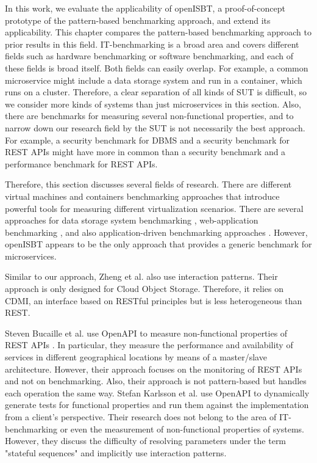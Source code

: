 In this work, we evaluate the applicability of openISBT, a proof-of-concept prototype of the pattern-based benchmarking approach, and extend its applicability. This chapter compares the pattern-based benchmarking approach to prior results in this field. IT-benchmarking is a broad area and covers different fields such as hardware benchmarking or software benchmarking, and each of these fields is broad itself. Both fields can easily overlap. For example, a common microservice might include a data storage system and run in a container, which runs on a cluster. Therefore, a clear separation of all kinds of SUT is difficult, so we consider more kinds of systems than just microservices in this section. Also, there are benchmarks for measuring several non-functional properties, and to narrow down our research field by the SUT is not necessarily the best approach. For example, a security benchmark for DBMS and a security benchmark for REST APIs might have more in common than a security benchmark and a performance benchmark for REST APIs.

Therefore, this section discusses several fields of research.
There are different virtual machines and containers benchmarking approaches \cite{RelWor:VM_Borhani, RelWor:VM_Kejiang, RelWor:VM_Varghese, RelWor:VM_Zaitsev, RelWor:VM_Carpio} that introduce powerful tools for measuring different virtualization scenarios. There are several approaches for data storage system benchmarking \cite{RelWor:DB_NDBench, YCSB+T, BenchFoundary, RelWor:DB_COSBench, RelWork:OLTP, RelWork:CloudDBFramework, YCSB++}, web-application benchmarking  \cite{bermbach_benchmarking_web_api, bermbach_benchmarking_web_api_rev}, and also application-driven benchmarking approaches \cite{RelWor:VM_containerized_webapps, deathStarBench, relwork_µ-suite}. However,  openISBT appears to be the only approach that provides a generic benchmark for microservices.


Similar to our approach, Zheng et al. also use interaction patterns\cite{RelWor:DB_COSBench}. Their approach is only designed for Cloud Object Storage. Therefore, it relies on CDMI, an interface based on RESTful principles but is less heterogeneous than REST.

Steven Bucaille et al. use OpenAPI to measure non-functional properties of REST APIs \cite{openAPI_Monitoring_framework}. In particular, they measure the performance and availability of services in different geographical locations by means of a master/slave architecture. However, their approach focuses on the monitoring of REST APIs and not on benchmarking. Also, their approach is not pattern-based but handles each operation the same way. Stefan Karlsson et al. use OpenAPI to dynamically generate tests for functional properties \cite{OpenAPI_testing_framework} and run them against the implementation from a client's perspective. Their research does not belong to the area of IT-benchmarking or even the measurement of non-functional properties of systems. However, they discuss the difficulty of resolving parameters under the term "stateful sequences" and implicitly use interaction patterns. 

